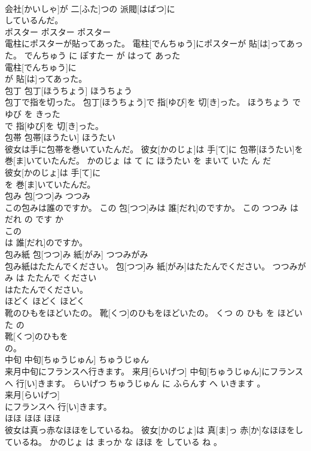 \documentclass[8pt]{extreport}
\begin{document}
\begin{CJK}{UTF8}{min}
\\	会社[かいしゃ]が 二[ふた]つの 派閥[はばつ]に
\\	しているんだ。			
\\	ポスター	ポスター	ポスター	
\\	電柱にポスターが貼ってあった。	電柱[でんちゅう]にポスターが 貼[は]ってあった。	でんちゅう に ぽすたー が はって あった	
\\	電柱[でんちゅう]に
\\	が 貼[は]ってあった。			
\\	包丁	包丁[ほうちょう]	ほうちょう	
\\	包丁で指を切った。	包丁[ほうちょう]で 指[ゆび]を 切[き]った。	ほうちょう で ゆび を きった	
\\	で 指[ゆび]を 切[き]った。			
\\	包帯	包帯[ほうたい]	ほうたい	
\\	彼女は手に包帯を巻いていたんだ。	彼女[かのじょ]は 手[て]に 包帯[ほうたい]を 巻[ま]いていたんだ。	かのじょ は て に ほうたい を まいて いた ん だ	
\\	彼女[かのじょ]は 手[て]に
\\	を 巻[ま]いていたんだ。			
\\	包み	包[つつ]み	つつみ	
\\	この包みは誰のですか。	この 包[つつ]みは 誰[だれ]のですか。	この つつみ は だれ の です か	
\\	この
\\	は 誰[だれ]のですか。			
\\	包み紙	包[つつ]み 紙[がみ]	つつみがみ	
\\	包み紙はたたんでください。	包[つつ]み 紙[がみ]はたたんでください。	つつみがみ は たたんで ください	
\\	はたたんでください。			
\\	ほどく	ほどく	ほどく	
\\	靴のひもをほどいたの。	靴[くつ]のひもをほどいたの。	くつ の ひも を ほどいた の	
\\	靴[くつ]のひもを
\\	の。			
\\	中旬	中旬[ちゅうじゅん]	ちゅうじゅん	
\\	来月中旬にフランスへ行きます。	来月[らいげつ] 中旬[ちゅうじゅん]にフランスへ 行[い]きます。	らいげつ ちゅうじゅん に ふらんす へ いきます 。	
\\	来月[らいげつ]
\\	にフランスへ 行[い]きます。			
\\	ほほ	ほほ	ほほ	
\\	彼女は真っ赤なほほをしているね。	彼女[かのじょ]は 真[ま]っ 赤[か]なほほをしているね。	かのじょ は まっか な ほほ を している ね 。	

\end{CJK}
\end{document}

